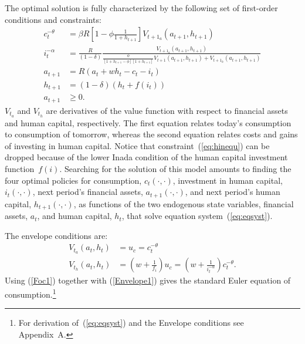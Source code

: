 \documentclass[a4paper,12pt]{article}
\begin{document}
The optimal solution is fully characterized by the following set of first-order conditions and constraints:
\begin{subequations}
\label{eq:eqsyst}
\begin{align}
	c_{t}^{-\theta}  &  = \beta R \left[1 - \phi\frac{1} {1 + h_{t+1}}\right] \text{$V_{t+1_{a}}$}\left(a_{t+1},h_{t+1}\right)  \label{Foc1} \\
	i_{t}^{-\alpha}  &  = \frac{R} {\left(1 - \delta\right)} \frac{\text{$V_{t+1_{a}}$}\left(a_{t+1},h_{t+1}\right)} {\frac{\phi} {\left[1 + h_{t+1} - \phi\right] \left[1 + h_{t+1}\right]} V_{t+1}\left(a_{t+1},h_{t+1}\right) + \text{$V_{t+1_{h}}$}\left(a_{t+1},h_{t+1}\right)}  \label{Foc2} \\
	a_{t+1}  &  = R \left(a_{t} + w h_{t} - c_{t} - i_{t}\right)  \\
	h_{t+1}  &  = \left(1 - \delta\right) \left(h_{t} + f\left(i_{t}\right)\right)  \\
	a_{t+1}  &  \geq0.
\end{align}
\end{subequations}
$V_{t_{a}}$ and $V_{t_{h}}$ are derivatives of the value function with respect to financial assets and human capital, respectively. The first equation relates today's consumption to consumption of tomorrow, whereas the second equation relates costs and gains of investing in human capital. Notice that constraint~(\ref{eq:hinequ}) can be dropped because of the lower Inada condition of the human capital investment function~$f(i)$. Searching for the solution of this model amounts to finding the four optimal policies for consumption, $c_{t}\left( \cdot,\cdot\right)$, investment in human capital, $i_{t}\left( \cdot,\cdot\right)$, next period's financial assets, $a_{t+1}\left( \cdot,\cdot\right)$, and next period's human capital, $h_{t+1}\left(  \cdot,\cdot\right)$, as functions of the two endogenous state variables, financial assets, $a_{t}$, and human capital, $h_{t}$, that solve equation system~(\ref{eq:eqsyst}).

The envelope conditions are:
\begin{subequations}
\begin{align}
	\text{$V_{t_{a}}$}\left(a_{t},h_{t}\right)  &  = u_{c} = c_{t}^{-\theta}  \label{Envelope1} \\
	\text{$V_{t_{h}}$}\left(a_{t},h_{t}\right)  &  = \left(w + \frac{1} {f_{i}}\right) u_{c} = \left(w + \frac{1} {i_{t}^{-\alpha}}\right) c_{t}^{-\theta} \text{.} \label{Envelope2}
\end{align}
\end{subequations}
Using (\ref{Foc1}) together with (\ref{Envelope1}) gives the standard Euler equation of consumption.\footnote{For derivation of~(\ref{eq:eqsyst}) and the Envelope conditions see Appendix~A.}
\end{document}
